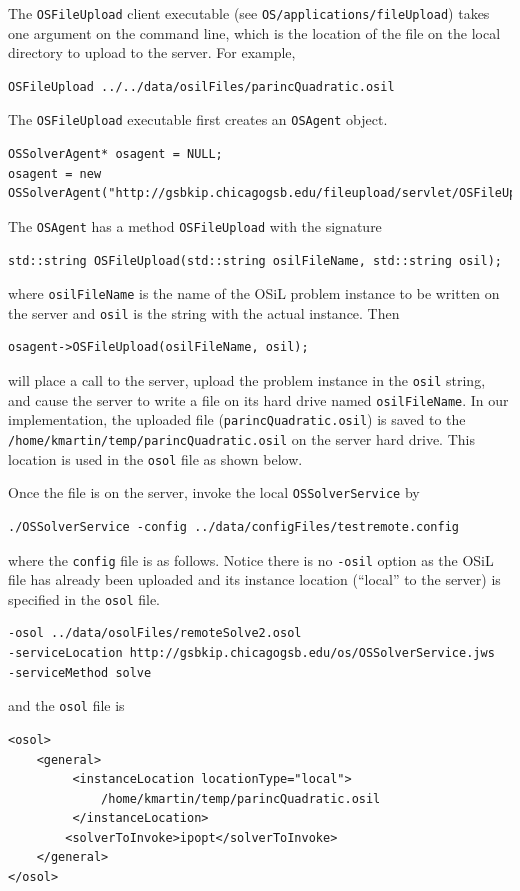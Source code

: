 \documentclass[11pt]{article}
\renewcommand{\_}{{\char"5F}}
\renewcommand{\{}{{\char"7B}}
\renewcommand{\}}{{\char"7D}}
\renewcommand{\^}{{\char"0D}}
\renewcommand{\'}{{\char"0D}}
\begin{document}
\begin{enumerate}[Step 1:]
The {\tt OSFileUpload} client executable (see {\tt OS/applications/fileUpload}) takes one argument on the command line,
which is the location of the file on the local directory to upload to the server. For example,
\begin{verbatim}
OSFileUpload ../../data/osilFiles/parincQuadratic.osil
\end{verbatim}
The {\tt OSFileUpload} executable first creates an {\tt OSAgent} object.
\begin{verbatim}
OSSolverAgent* osagent = NULL;
osagent = new OSSolverAgent("http://gsbkip.chicagogsb.edu/fileupload/servlet/OSFileUpload");
\end{verbatim}
The {\tt OSAgent}  has a method {\tt OSFileUpload} with the signature
\begin{verbatim}
std::string OSFileUpload(std::string osilFileName, std::string osil);
\end{verbatim}
where {\tt osilFileName} is  the name of the OSiL problem instance to be written on the server and {\tt osil}
is the string with the actual instance. Then
\begin{verbatim}
osagent->OSFileUpload(osilFileName, osil);
\end{verbatim}
will place a call to the server, upload the problem instance in the {\tt osil} string, and cause the server
to write a file on its hard drive named {\tt osilFileName}. In our implementation, the uploaded file
({\tt parincQuadratic.osil}) is saved to the {\tt/home/kmartin/temp/parincQuadratic.osil} on the server hard drive.
This location is used in the {\tt osol} file as shown below.

Once the file is on the server, invoke the local {\tt OSSolverService} by
\begin{verbatim}
./OSSolverService -config ../data/configFiles/testremote.config
\end{verbatim}
where the {\tt config} file is as follows. Notice there is no {\tt -osil}  option as the OSiL file has already
been uploaded and its instance location (``local'' to the server) is specified in the {\tt osol} file.
\begin{verbatim}
-osol ../data/osolFiles/remoteSolve2.osol
-serviceLocation http://gsbkip.chicagogsb.edu/os/OSSolverService.jws
-serviceMethod solve
\end{verbatim}
and the {\tt osol} file is
\begin{verbatim}
<osol>
    <general>
         <instanceLocation locationType="local">
             /home/kmartin/temp/parincQuadratic.osil
         </instanceLocation>
        <solverToInvoke>ipopt</solverToInvoke>      
    </general>
</osol>
\end{verbatim}


\end{enumerate}
\end{document}
